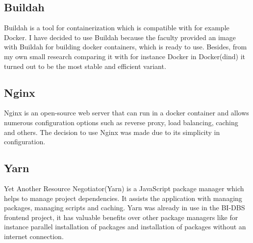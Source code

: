 \subsection{Buildah} Buildah is a tool for containerization which is compatible with for example Docker. I have decided to use Buildah because the faculty provided an image with Buildah for building docker containers, which is ready to use. Besides, from my own small research comparing it with for instance Docker in Docker(dind) it turned out to be the most stable and efficient variant. \cite{buildah}


\subsection{Nginx} Nginx is an open-source web server that can run in a docker container and allows numerous configuration options such as reverse proxy, load balancing, caching and others. The decision to use Nginx was made due to its simplicity in configuration. \cite{nginx, nginx-2}


\subsection{Yarn} Yet Another Resource Negotiator(Yarn) is a JavaScript package manager which helps to manage project dependencies. It assists the application with managing packages, managing scripts and caching. Yarn was already in use in the BI-DBS frontend project, it has valuable benefits over other package managers like for instance parallel installation of packages and installation of packages without an internet connection. \cite{yarn, yarn-2}
